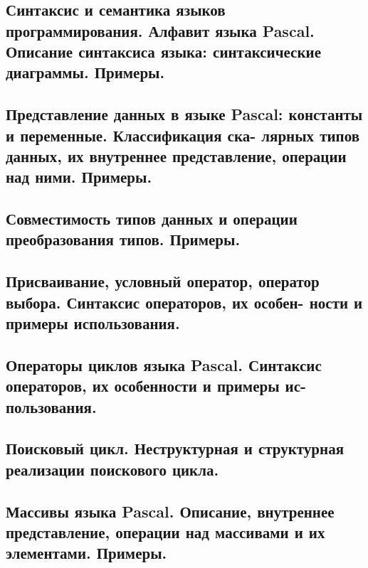 \documentclass[a4paper, 10pt]{article}
\begin{document}
\section{}

\subsection{Синтаксис  и  семантика  языков  программирования.  Алфавит  языка  Pascal.  Описание синтаксиса языка: синтаксические диаграммы. Примеры. }



\subsection{Представление  данных  в  языке  Pascal:  константы  и  переменные.  Классификация  ска-
лярных типов данных, их внутреннее представление, операции над ними. Примеры.} 



\subsection{Совместимость типов данных и операции преобразования типов. Примеры. }



\subsection{Присваивание, условный оператор, оператор выбора. Синтаксис операторов, их особен-
ности и примеры использования. }



\subsection{Операторы циклов языка Pascal. Синтаксис операторов, их особенности и примеры ис-
пользования. }



\subsection{Поисковый цикл. Неструктурная и структурная реализации поискового цикла. }



\subsection{Массивы языка Pascal. Описание, внутреннее представление, операции над массивами и 
их элементами. Примеры. }
\end{document}
